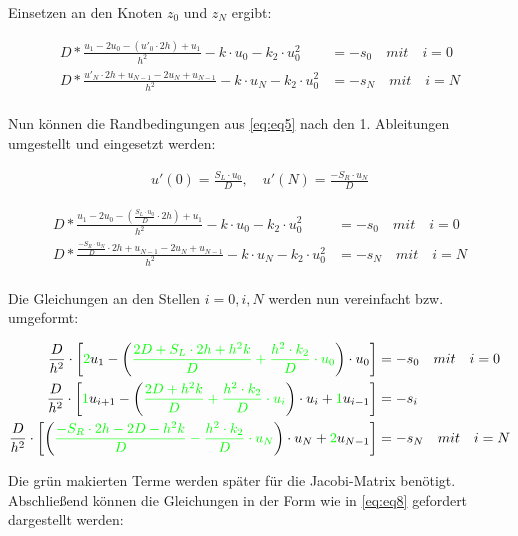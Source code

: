 \documentclass[
	pagesize,
	fontsize=12pt,
	paper=a4,
	oneside,
   reqno
]{scrartcl}
\begin{document}
Einsetzen an den Knoten $z_0$ und $z_N$ ergibt:

\begin{align*}
   D*\frac{u_1-2u_0-(u'_0\cdot 2h)+u_1}{h^2} - k\cdot u_0 -k_2\cdot u_0^2 &= -s_0 \quad mit \quad i = 0 \\
   D*\frac{u'_N\cdot 2h+u_{N-1}-2u_N+u_{N-1}}{h^2} - k\cdot u_N -k_2\cdot u_0^2 &= -s_N \quad mit \quad i = N \\
\end{align*}

Nun können die Randbedingungen aus \autoref{eq:eq5} nach den 1. Ableitungen umgestellt und eingesetzt werden:

\begin{align*}
   u'(0) = \frac{S_L \cdot u_0}{D}, \quad u'(N) = \frac{-S_R \cdot u_N}{D}
\end{align*}

\begin{align*}
   D*\frac{u_1-2u_0-(\frac{S_L \cdot u_0}{D}\cdot 2h)+u_1}{h^2} - k\cdot u_0 -k_2\cdot u_0^2 &= -s_0 \quad mit \quad i = 0 \\
   D*\frac{\frac{-S_R \cdot u_N}{D}\cdot 2h+u_{N-1}-2u_N+u_{N-1}}{h^2} - k\cdot u_N -k_2\cdot u_0^2 &= -s_N \quad mit \quad i = N \\
\end{align*}

Die Gleichungen an den Stellen $i=0, i, N$ werden nun vereinfacht bzw. umgeformt:

\begin{align*}
   \frac{D}{h^2}\cdot \left[ \textcolor{green}{2}u_1-\left( \textcolor{green}{\frac{2D+S_L\cdot 2h+h^2k}{D}+\frac{h^2\cdot k_2}{D}\cdot u_0}\right) \cdot u_0\right] &= -s_0 \quad mit \quad i = 0 \\
   \frac{D}{h^2}\cdot \left[ \textcolor{green}{1}u_{i+1}-\left( \textcolor{green}{\frac{2D+h^2k}{D}+\frac{h^2\cdot k_2}{D}\cdot u_i}\right) \cdot u_i+\textcolor{green}{1}u_{i-1}\right] &= -s_i \\
   \frac{D}{h^2}\cdot \left[ \left( \textcolor{green}{\frac{-S_R\cdot 2h-2D-h^2k}{D}-\frac{h^2\cdot k_2}{D}\cdot u_N}\right) \cdot u_N+\textcolor{green}{2}u_{N-1}\right] &= -s_N \quad mit \quad i = N \\
\end{align*}

Die grün makierten Terme werden später für die Jacobi-Matrix benötigt.\\

Abschließend können die Gleichungen in der Form wie in \autoref{eq:eq8} gefordert dargestellt werden:
\end{document}
